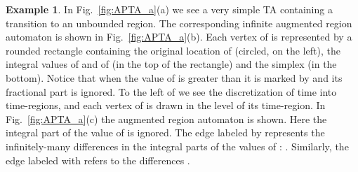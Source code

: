 \documentclass[11pt]{amsart}
\theoremstyle{definition}
\newtheorem{example}[theorem]{Example}
\begin{document}
\begin{example}
	In Fig.~\ref{fig:APTA_a}(a) we see a very simple TA  containing a transition to an unbounded region.
	The corresponding infinite augmented region automaton  is shown in Fig.~\ref{fig:APTA_a}(b).
	Each vertex of  is represented by a rounded rectangle containing the original location of  (circled, on the left), the integral values of  and of  (in the top of the rectangle) and the simplex (in the bottom).
	Notice that when the value of  is greater than  it is marked by  and its fractional part is ignored.
	To the left of  we see the discretization of time  into time-regions, and each vertex of  is drawn in the level of its time-region.
	In  Fig.~\ref{fig:APTA_a}(c) the augmented region automaton  is shown.
	Here the integral part of the value of  is ignored.
	The edge labeled by  represents the infinitely-many differences in the integral parts of the values of : .
	Similarly, the edge labeled with  refers to the differences .
	\begin{figure}[t]
\centering
\end{figure}
\end{example}
\end{document}
